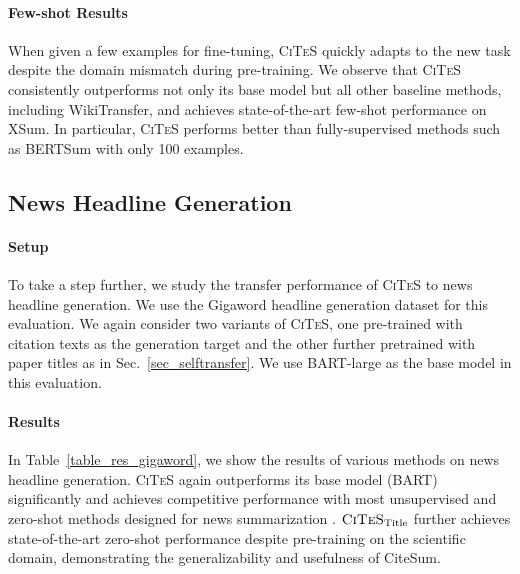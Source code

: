 \documentclass[11pt]{article}
\newcommand{\ours}{\textsc{CiTeS}\xspace}
\newcommand{\oursTitle}{$\textsc{CiTeS}_{\text{Title}}$\xspace}
\newcommand{\ourdata}{CiteSum\xspace}
\begin{document}
\paragraph{Few-shot Results}
When given a few examples for fine-tuning, \ours quickly adapts to the new task despite the domain mismatch during pre-training.
We observe that \ours consistently outperforms not only its base model  but all other baseline methods, including WikiTransfer, and achieves state-of-the-art few-shot performance on XSum.
In particular, \ours performs better than fully-supervised methods such as BERTSum \cite{liu-lapata-2019-text} with only 100 examples.



\subsection{News Headline Generation}
\paragraph{Setup}
To take a step further, we study the transfer performance of \ours to news headline generation.
We use the Gigaword headline generation dataset \cite{rush-etal-2015-neural} for this evaluation.
We again consider two variants of \ours, one pre-trained with citation texts as the generation target and the other further pretrained with paper titles as in Sec.~\ref{sec_selftransfer}.
We use BART-large \cite{lewis-etal-2020-bart} as the base model in this evaluation.

\paragraph{Results}
In Table~\ref{table_res_gigaword}, we show the results of various methods on news headline generation.
\ours again outperforms its base model (BART) significantly and achieves competitive performance with most unsupervised and zero-shot methods designed for news summarization \cite{zhang2020pegasus,zhu2021leveraging}.
\oursTitle further achieves state-of-the-art zero-shot performance despite pre-training on the scientific domain, demonstrating the generalizability and usefulness of \ourdata.
\end{document}
